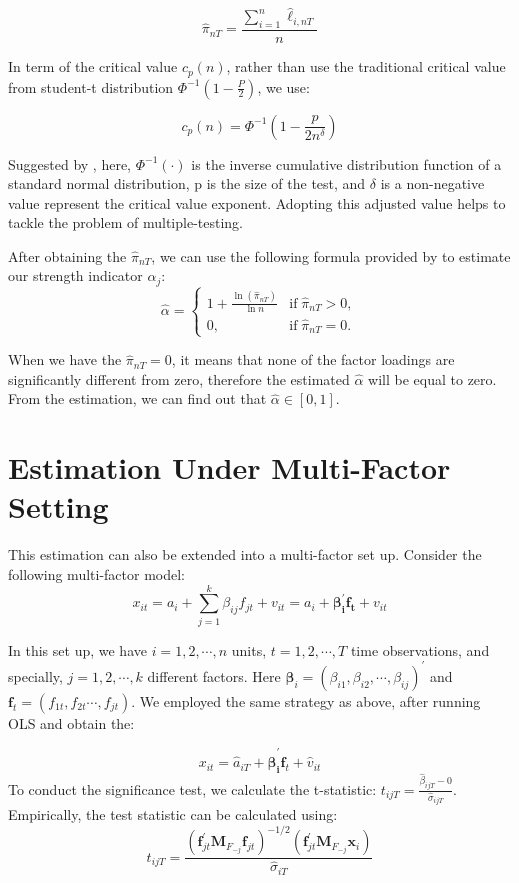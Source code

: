 \[  \hat{\pi}_{nT} = \frac{\sum_{i=1}^n \hat{\ell}_{i,nT}}{n} \tag{4} \label{pi_function} \]


In term of the critical value $c_p(n)$, rather than use the traditional critical value from student-t distribution $\Phi^{-1}(1-\frac{P}{2})$, we use:

\[   c_p(n) = \Phi^{-1}(1 - \frac{p}{2n^\delta})   \tag{5} \label{critical_value_function} \]

Suggested by , here, $\Phi^{-1}(\cdot)$ is the inverse cumulative distribution function of a standard normal distribution, p is the size of the test, and $\delta$ is a non-negative value represent the critical value exponent. 
Adopting this adjusted value helps to tackle the problem of multiple-testing.


After obtaining the $\hat{\pi}_{nT}$, we can use the following formula provided by  to estimate our strength indicator $\alpha_j$:
\[ \hat{\alpha} = \begin{cases}
1+\frac{\ln(\hat{\pi}_{nT})}{\ln n} & \text{if}\; \hat{\pi}_{nT} > 0,\\
0, & \text{if}\; \hat{\pi}_{nT} = 0.
	\end{cases} \tag{6} \label{estimation_method} \]

When we have the $\hat{\pi}_{nT} = 0$, it means that none of the factor loadings are significantly different from zero, therefore the estimated $\hat{\alpha}$ will be equal to zero. 
From the estimation, we can find out that $\hat{\alpha} \in [0,1]$.

\section{Estimation Under Multi-Factor Setting}\label{strength_multi_estimation}

This estimation can also be extended into a multi-factor set up.
Consider the following multi-factor model:
\[x_{it} = a_i +\sum_{j = 1}^k\beta_{ij}f_{jt} +v_{it} = a_i + \bm{\beta^{\prime}_{i}f_{t}} +v_{it} \tag{7} \label{multi_factor_model} \]

In this set up, we have $i = 1, 2, \cdots, n$ units, $t = 1, 2, \cdots, T$ time observations, and specially, $j = 1, 2,\cdots, k$ different factors.
Here $\bm{\beta}_{i} = (\beta_{i1}, \beta_{i2}, \cdots, \beta_{ij})^{\prime} $ and $\bm{f}_t = (f_{1t}, f_{2t}\cdots, f_{jt})$.
We employed the same strategy as above, after running OLS and obtain the:

\[ x_{it} =\hat{a}_{iT} + \bm{\hat{\beta}^{\prime}_{i}}\bm{f}_{t} + \hat{v}_{it}    \]
To conduct the significance test, we calculate the t-statistic: $t_{ijT} = \frac{\hat{\beta}_{ijT}-0}{\hat{\sigma}_{ijT}}$. Empirically, the test statistic can be calculated using:
\[ t_{i j T}=\frac{\left(\bm{f}_{j t}^{\prime} \bm{M}_{F_{-j}} \bm{f}_{j t}\right)^{-1 / 2}\left(\bm{f}_{j t}^{\prime} \bm{M}_{F_{-j}} \bm{x}_{i}\right)}{\hat{\sigma}_{i T}} \]

